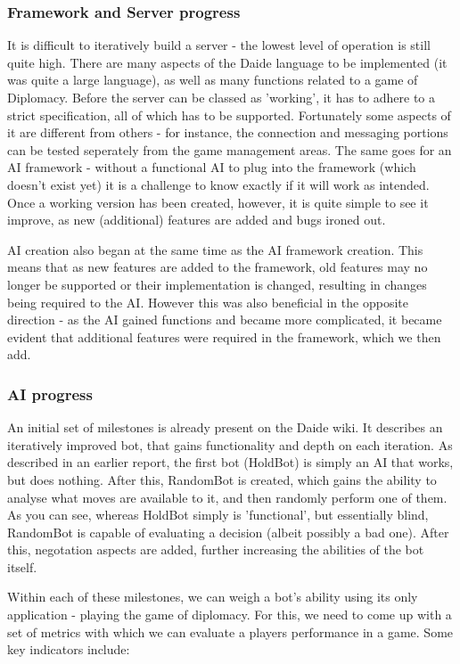 \documentclass[12pt]{article}
\begin{document}
\subsubsection{Framework and Server progress}
It is difficult to iteratively build a server - the lowest level of operation is still quite high. There are many aspects of the Daide language to be implemented (it was quite a large language), as well as many functions related to a game of Diplomacy. Before the server can be classed as 'working', it has to adhere to a strict specification, all of which has to be supported. Fortunately some aspects of it are different from others - for instance, the connection and messaging portions can be tested seperately from the game management areas. The same goes for an AI framework - without a functional AI to plug into the framework (which doesn't exist yet) it is a challenge to know exactly if it will work as intended. Once a working version has been created, however, it is quite simple to see it improve, as new (additional) features are added and bugs ironed out.

AI creation also began at the same time as the AI framework creation. This means that as new features are added to the framework, old features may no longer be supported or their implementation is changed, resulting in changes being required to the AI. However this was also beneficial in the opposite direction - as the AI gained functions and became more complicated, it became evident that additional features were required in the framework, which we then add. 

\subsubsection{AI progress}
An initial set of milestones is already present on the Daide wiki. It describes an iteratively improved bot, that gains functionality and depth on each iteration. As described in an earlier report, the first bot (HoldBot) is simply an AI that works, but does nothing. After this, RandomBot is created, which gains the ability to analyse what moves are available to it, and then randomly perform one of them. As you can see, whereas HoldBot simply is 'functional', but essentially blind, RandomBot is capable of evaluating a decision (albeit possibly a bad one). After this, negotation aspects are added, further increasing the abilities of the bot itself. 

Within each of these milestones, we can weigh a bot's ability using its only application - playing the game of diplomacy. For this, we need to come up with a set of metrics with which we can evaluate a players performance in a game. Some key indicators include:
\end{document}
